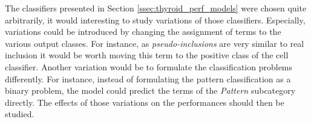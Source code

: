 The classifiers presented in Section \ref{ssec:thyroid_perf_models} were chosen quite arbitrarily, it would interesting to study variations of those classifiers. Especially, variations could be introduced by changing the assignment of terms to the various output classes. For instance, as \textit{pseudo-inclusions} are very similar to real inclusion it would be worth moving this term to the positive class of the cell classifier. Another variation would be to formulate the classification problems differently. For instance, instead of formulating the pattern classification as a binary problem, the model could predict the terms of the \textit{Pattern} subcategory directly. The effects of those variations on the performances should then be studied.
 
